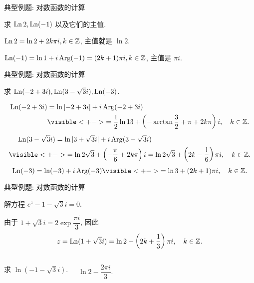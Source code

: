 \begin{frame}{典型例题: 对数函数的计算}
\begin{example}
求 $\operatorname{Ln} 2,\operatorname{Ln}(-1)$ 以及它们的主值.
\end{example}

\begin{solution}
$\operatorname{Ln}2=\ln2+2k\pi i, k\in{\mathbb{Z}}$,
\onslide<+->
主值就是 $\ln 2$.

\onslide<+->
$\operatorname{Ln}(-1)=\ln1+i\operatorname{Arg}(-1)=(2k+1)\pi i, k\in{\mathbb{Z}}$,
\onslide<+->
主值是 $\pi i$.
\end{solution}
\end{frame}


\begin{frame}{典型例题: 对数函数的计算}
\begin{example}
求 $\operatorname{Ln}(-2+3i),\operatorname{Ln}(3-\sqrt3 i),\operatorname{Ln}(-3)$.
\end{example}
\begin{solution}
\vspace{-1.4\baselineskip}
\begin{align*}
\Ln(-2+3i)&=\ln\abs{-2+3i}+i\Arg(-2+3i)\\
&\visible<+->{=\frac 12\ln 13+\left(-\arctan\frac 32+\pi+2k\pi\right)i,\quad k\in\BZ.}
\end{align*}
\onslide<+->
\vspace{-1.4\baselineskip}
\begin{align*}
&\peq\Ln(3-\sqrt3i)=\ln|3+\sqrt 3i|+i\Arg(3-\sqrt 3i)\\
&\visible<+->{=\ln 2\sqrt 3+\left(-\frac\pi6+2k\pi\right)i
=\ln 2\sqrt 3+\left(2k-\frac16\right)\pi i,\quad k\in\BZ.}
\end{align*}
\onslide<+->
\vspace{-1.4\baselineskip}
\[\Ln(-3)=\ln(-3)+i\Arg(-3)
\visible<+->{=\ln3+(2k+1)\pi i,\quad k\in\BZ.}\]
\vspace{-1.4\baselineskip}
\end{solution}
\end{frame}


\begin{frame}[<*>]{典型例题: 对数函数的计算}
\onslide<+->
\begin{example}
解方程 $e^z-1-\sqrt 3i=0$.
\end{example}
\onslide<+->
\begin{solution}
由于 $1+\sqrt 3 i=2\exp\dfrac{\pi i}3$,
\onslide<+->
因此
\[z=\operatorname{Ln}(1+\sqrt 3i)=\ln 2+\left(2k+\frac13\right)\pi i,\quad k\in{\mathbb{Z}}.\]
\end{solution}
\onslide<+->
\begin{columns}
		\begin{exercise}
		求 $\ln(-1-\sqrt3 i)$.
		\end{exercise}
		\onslide<+->
		\begin{answer}
		$\ln 2-\dfrac{2\pi i}3$.
		\end{answer}
\end{columns}
\end{frame}


